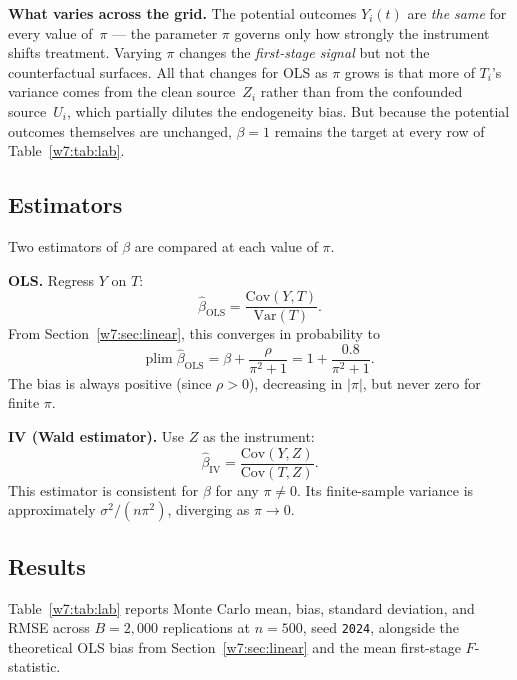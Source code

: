 \documentclass[master.tex]{subfiles}
\begin{document}
\begin{tcolorbox}[defstyle, title={Potential Outcomes Interpretation of the DGP}]
\medskip\noindent\textbf{What varies across the grid.}
The potential outcomes $Y_i(t)$ are \emph{the same} for
every value of~$\pi$ --- the parameter $\pi$ governs only
how strongly the instrument shifts treatment.  Varying $\pi$
changes the \emph{first-stage signal} but not the
counterfactual surfaces.  All that changes for OLS as
$\pi$ grows is that more of $T_i$'s variance comes from the
clean source~$Z_i$ rather than from the confounded
source~$U_i$, which partially dilutes the endogeneity
bias.  But because the potential outcomes themselves are
unchanged, $\beta = 1$ remains the target at every row of
Table~\ref{w7:tab:lab}.
\end{tcolorbox}

\subsection*{Estimators}

Two estimators of $\beta$ are compared at each value of $\pi$.

\medskip\noindent\textbf{OLS.}  Regress $Y$ on $T$:
\[
  \hat\beta_{\mathrm{OLS}}
  = \frac{\mathrm{Cov}(Y, T)}{\mathrm{Var}(T)}.
\]
From Section~\ref{w7:sec:linear}, this converges in probability to
\[
  \mathrm{plim}\;\hat\beta_{\mathrm{OLS}}
  = \beta + \frac{\rho}{\pi^2 + 1}
  = 1 + \frac{0.8}{\pi^2 + 1}.
\]
The bias is always positive (since $\rho > 0$), decreasing
in $|\pi|$, but never zero for finite $\pi$.

\medskip\noindent\textbf{IV (Wald estimator).}  Use $Z$ as
the instrument:
\[
  \hat\beta_{\mathrm{IV}}
  = \frac{\mathrm{Cov}(Y, Z)}{\mathrm{Cov}(T, Z)}.
\]
This estimator is consistent for $\beta$ for any $\pi \neq 0$.
Its finite-sample variance is approximately
$\sigma^2 / (n \pi^2)$, diverging as $\pi \to 0$.

\subsection*{Results}

Table~\ref{w7:tab:lab} reports Monte Carlo mean, bias, standard
deviation, and RMSE across $B = 2{,}000$ replications at
$n = 500$, seed \texttt{2024}, alongside the theoretical OLS
bias from Section~\ref{w7:sec:linear} and the mean first-stage
$F$-statistic.
\end{document}

